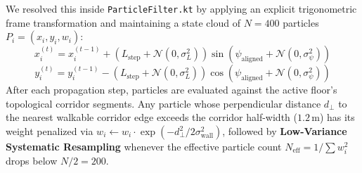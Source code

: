 \documentclass[11pt,a4paper]{article}
\begin{document}
We resolved this inside \texttt{ParticleFilter.kt} by applying an explicit trigonometric frame transformation and maintaining a state cloud of $N = 400$ particles $P_i = (x_i, y_i, w_i)$:
\begin{equation}
    x_i^{(t)} = x_i^{(t-1)} + \left(L_{\text{step}} + \mathcal{N}(0, \sigma_L^2)\right) \sin(\psi_{\text{aligned}} + \mathcal{N}(0, \sigma_\psi^2))
\end{equation}
\begin{equation}
    y_i^{(t)} = y_i^{(t-1)} - \left(L_{\text{step}} + \mathcal{N}(0, \sigma_L^2)\right) \cos(\psi_{\text{aligned}} + \mathcal{N}(0, \sigma_\psi^2))
\end{equation}
After each propagation step, particles are evaluated against the active floor's topological corridor segments. Any particle whose perpendicular distance $d_\perp$ to the nearest walkable corridor edge exceeds the corridor half-width ($1.2\,\text{m}$) has its weight penalized via $w_i \leftarrow w_i \cdot \exp(-d_\perp^2 / 2\sigma_{\text{wall}}^2)$, followed by \textbf{Low-Variance Systematic Resampling} whenever the effective particle count $N_{\text{eff}} = 1 / \sum w_i^2$ drops below $N/2 = 200$.
\end{document}
